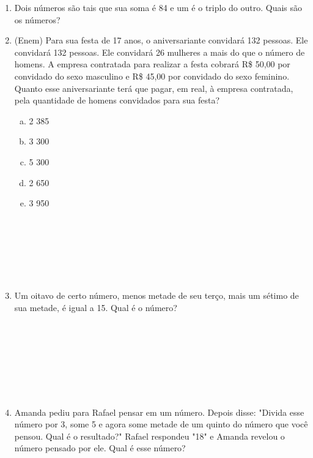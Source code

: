 \documentclass[a4paper,14pt]{article}
\begin{document}
\begin{multicols}{2}
\begin{enumerate}
			\item Dois números são tais que sua soma é 84 e um é o triplo do outro. Quais são os números? \newpage
			\item (Enem) Para sua festa de 17 anos, o aniversariante convidará 132 pessoas. Ele convidará 132 pessoas. Ele convidará 26 mulheres a mais do que o número de homens. A empresa contratada para realizar a festa cobrará R\$ 50,00 por convidado do sexo masculino e R\$ 45,00 por convidado do sexo feminino. \\ Quanto esse aniversariante terá que pagar, em real, à empresa contratada, pela quantidade de homens convidados para sua festa?
			\begin{enumerate}[a)]
				\item 2 385
				\item 3 300
				\item 5 300
				\item 2 650
				\item 3 950 \\\\\\\\\\\\\\
			\end{enumerate}
			\item Um oitavo de certo número, menos metade de seu terço, mais um sétimo de sua metade, é igual a 15. Qual é o número? \\\\\\\\\\\\\\\\
			\item Amanda pediu para Rafael pensar em um número. Depois disse: "Divida esse número por 3, some 5 e agora some metade de um quinto do número que você pensou. Qual é o resultado?" Rafael respondeu "18" e Amanda revelou o número pensado por ele. Qual é esse número? \\\\\\\\\\\\\\
		\end{enumerate}

\end{multicols}
\end{document}
